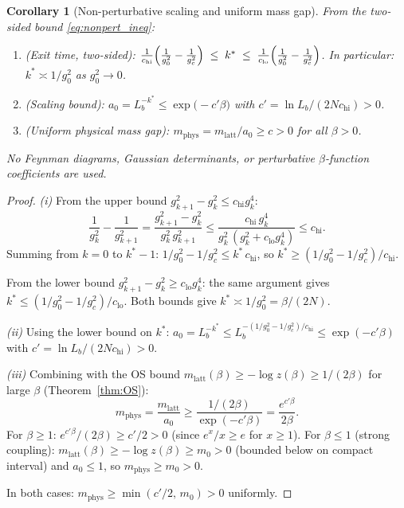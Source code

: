 \documentclass[11pt,a4paper]{amsart}
\newtheorem{corollary}[theorem]{Corollary}
\theoremstyle{definition}
\newcommand{\gB}{g^2_c}
\begin{document}
\begin{corollary}[Non-perturbative scaling and uniform mass gap]
\label{cor:nonpert_scaling}
From the two-sided bound \eqref{eq:nonpert_ineq}:
\begin{enumerate}[label=(\roman*)]
\item \emph{(Exit time, two-sided):}
  $\frac{1}{c_{\mathrm{hi}}}\Bigl(\frac{1}{g^2_0} - \frac{1}{\gB}\Bigr)
  \;\le\; k^*
  \;\le\; \frac{1}{c_{\mathrm{lo}}}\Bigl(\frac{1}{g^2_0} - \frac{1}{\gB}\Bigr)$.
  In particular: $k^* \asymp 1/g^2_0$ as $g^2_0 \to 0$.
\item \emph{(Scaling bound):}
  $a_0 = L_b^{-k^*} \le \exp\!\bigl(-c'\beta\bigr)$
  with $c' = \ln L_b / (2N c_{\mathrm{hi}}) > 0$.
\item \emph{(Uniform physical mass gap):}
  $m_{\mathrm{phys}} = m_{\mathrm{latt}}/a_0
  \ge c > 0$ for all $\beta > 0$.
\end{enumerate}
No Feynman diagrams, Gaussian determinants, or perturbative $\beta$-function
coefficients are used.
\end{corollary}

\begin{proof}
\emph{(i)} From the upper bound $g^2_{k+1} - g^2_k \le c_{\mathrm{hi}} g^4_k$:
\[
  \frac{1}{g^2_k} - \frac{1}{g^2_{k+1}}
  = \frac{g^2_{k+1}-g^2_k}{g^2_k\,g^2_{k+1}}
  \le \frac{c_{\mathrm{hi}}\,g^4_k}{g^2_k\,(g^2_k + c_{\mathrm{lo}} g^4_k)}
  \le c_{\mathrm{hi}}.
\]
Summing from $k=0$ to $k^*-1$:
$1/g^2_0 - 1/\gB \le k^*\,c_{\mathrm{hi}}$,
so $k^* \ge (1/g^2_0 - 1/\gB)/c_{\mathrm{hi}}$.

From the lower bound $g^2_{k+1} - g^2_k \ge c_{\mathrm{lo}} g^4_k$:
the same argument gives
$k^* \le (1/g^2_0 - 1/\gB)/c_{\mathrm{lo}}$.
Both bounds give $k^* \asymp 1/g^2_0 = \beta/(2N)$.

\emph{(ii)} Using the lower bound on $k^*$:
$a_0 = L_b^{-k^*} \le L_b^{-(1/g^2_0 - 1/\gB)/c_{\mathrm{hi}}}
\le \exp(-c'\beta)$ with $c' = \ln L_b/(2N c_{\mathrm{hi}}) > 0$.

\emph{(iii)} Combining with the OS bound $m_{\mathrm{latt}}(\beta)
\ge -\log z(\beta) \ge 1/(2\beta)$ for large $\beta$
(Theorem~\ref{thm:OS}):
\[
  m_{\mathrm{phys}} = \frac{m_{\mathrm{latt}}}{a_0}
  \ge \frac{1/(2\beta)}{\exp(-c'\beta)}
  = \frac{e^{c'\beta}}{2\beta}.
\]
For $\beta \ge 1$: $e^{c'\beta}/(2\beta) \ge c'/2 > 0$
(since $e^x/x \ge e$ for $x \ge 1$).
For $\beta \le 1$ (strong coupling): $m_{\mathrm{latt}}(\beta)
\ge -\log z(\beta) \ge m_0 > 0$ (bounded below on compact interval)
and $a_0 \le 1$, so $m_{\mathrm{phys}} \ge m_0 > 0$.

In both cases: $m_{\mathrm{phys}} \ge \min(c'/2,\, m_0) > 0$ uniformly.
\end{proof}
\end{document}
